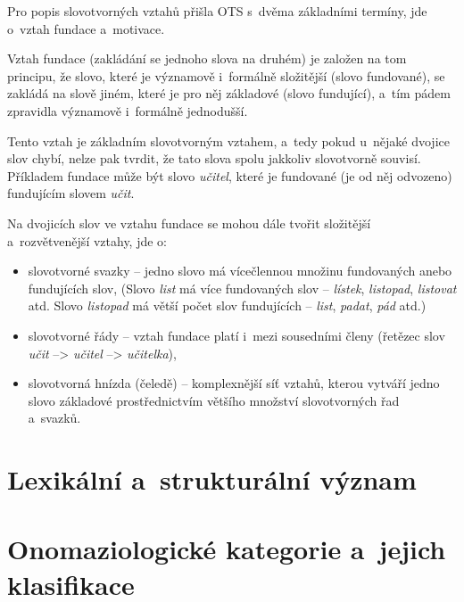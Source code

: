 Pro popis slovotvorných vztahů přišla OTS s~dvěma základními termíny,
jde o~vztah fundace a~motivace.

Vztah fundace (zakládání se jednoho slova na druhém) je založen na tom
principu, že slovo, které je významově i~formálně složitější (slovo
fundované), se zakládá na slově jiném, které je pro něj základové (slovo
fundující), a~tím pádem zpravidla významově i~formálně jednodušší.
\parencite[95]{dokulil00}

Tento vztah je základním slovotvorným vztahem, a~tedy pokud u~nějaké
dvojice slov chybí, nelze pak tvrdit, že tato slova spolu jakkoliv
slovotvorně souvisí. Příkladem fundace může být slovo \emph{učitel},
které je fundované (je od něj odvozeno) fundujícím slovem \emph{učit}.

Na dvojicích slov ve vztahu fundace se mohou dále tvořit složitější
a~rozvětvenější vztahy, jde o:

\begin{itemize}
\tightlist
\item
  slovotvorné svazky -- jedno slovo má vícečlennou množinu fundovaných
  anebo fundujících slov, (Slovo \emph{list} má více fundovaných slov --
  \emph{lístek}, \emph{listopad}, \emph{listovat} atd. Slovo
  \emph{listopad} má větší počet slov fundujících -- \emph{list},
  \emph{padat}, \emph{pád} atd.)
\item
  slovotvorné řády -- vztah fundace platí i~mezi sousedními členy
  (řetězec slov \emph{učit} --\textgreater{} \emph{učitel}
  --\textgreater{} \emph{učitelka}),
\item
  slovotvorná hnízda (čeledě) -- komplexnější síť vztahů, kterou vytváří
  jedno slovo základové prostřednictvím většího množství slovotvorných
  řad a~svazků.~\parencite[12--13]{dokulil62}
\end{itemize}

\hypertarget{lexikuxe1lnuxed-a-strukturuxe1lnuxed-vuxfdznam}{%
\section{Lexikální a~strukturální
význam}\label{lexikuxe1lnuxed-a-strukturuxe1lnuxed-vuxfdznam}}

\hypertarget{onomaziologickuxe9-kategorie-a-jejich-klasifikace}{%
\section{Onomaziologické kategorie a~jejich
klasifikace}\label{onomaziologickuxe9-kategorie-a-jejich-klasifikace}}

